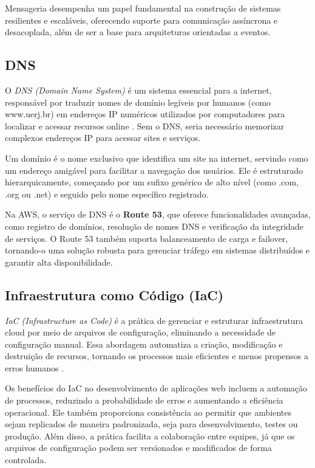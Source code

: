 Mensageria desempenha um papel fundamental na construção de sistemas resilientes e escaláveis, oferecendo suporte para comunicação assíncrona e desacoplada, além de ser a base para arquiteturas orientadas a eventos.

\subsection{DNS}


O \emph{DNS (Domain Name System)} é um sistema essencial para a internet, responsável por traduzir nomes de domínio legíveis por humanos (como www.uerj.br) em endereços IP numéricos utilizados por computadores para localizar e acessar recursos online \cite{what-is-dns}. Sem o DNS, seria necessário memorizar complexos endereços IP para acessar sites e serviços.

Um domínio é o nome exclusivo que identifica um site na internet, servindo como um endereço amigável para facilitar a navegação dos usuários. Ele é estruturado hierarquicamente, começando por um sufixo genérico de alto nível (como .com, .org ou .net) e seguido pelo nome específico registrado.

Na AWS, o serviço de DNS é o \textbf{Route 53}, que oferece funcionalidades avançadas, como registro de domínios, resolução de nomes DNS e verificação da integridade de serviços. O Route 53 também suporta balanceamento de carga e failover, tornando-o uma solução robusta para gerenciar tráfego em sistemas distribuídos e garantir alta disponibilidade.

\subsection{Infraestrutura como Código (IaC)}


\emph{IaC (Infrastructure as Code)} é a prática de gerenciar e estruturar infraestrutura cloud por meio de arquivos de configuração, eliminando a necessidade de configuração manual. Essa abordagem automatiza a criação, modificação e destruição de recursos, tornando os processos mais eficientes e menos propensos a erros humanos \cite{what-is-iac}.

Os benefícios do IaC no desenvolvimento de aplicações web incluem a automação de processos, reduzindo a probabilidade de erros e aumentando a eficiência operacional. Ele também proporciona consistência ao permitir que ambientes sejam replicados de maneira padronizada, seja para desenvolvimento, testes ou produção. Além disso, a prática facilita a colaboração entre equipes, já que os arquivos de configuração podem ser versionados e modificados de forma controlada. 

